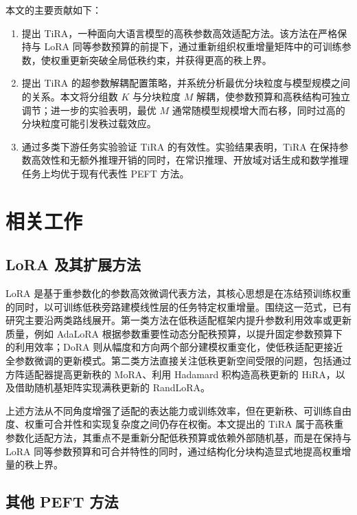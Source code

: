 ﻿\documentclass[UTF8,a4paper,11pt]{ctexart}
\begin{document}
本文的主要贡献如下：
\begin{enumerate}[leftmargin=2em]
    \item 提出 TiRA，一种面向大语言模型的高秩参数高效适配方法。该方法在严格保持与 LoRA 同等参数预算的前提下，通过重新组织权重增量矩阵中的可训练参数，使权重更新突破全局低秩约束，并获得更高的秩上界。
    \item 提出 TiRA 的超参数解耦配置策略，并系统分析最优分块粒度与模型规模之间的关系。本文将分组数 $K$ 与分块粒度 $M$ 解耦，使参数预算和高秩结构可独立调节；进一步的实验表明，最优 $M$ 通常随模型规模增大而右移，同时过高的分块粒度可能引发秩过载效应。
    \item 通过多类下游任务实验验证 TiRA 的有效性。实验结果表明，TiRA 在保持参数高效性和无额外推理开销的同时，在常识推理、开放域对话生成和数学推理任务上均优于现有代表性 PEFT 方法。
\end{enumerate}

\section{相关工作}

\subsection{LoRA 及其扩展方法}

LoRA\cite{hu2022lora} 是基于重参数化的参数高效微调代表方法，其核心思想是在冻结预训练权重的同时，以可训练低秩旁路建模线性层的任务特定权重增量。围绕这一范式，已有研究主要沿两类路线展开。第一类方法在低秩适配框架内提升参数利用效率或更新质量，例如 AdaLoRA\cite{zhang2023adalora} 根据参数重要性动态分配秩预算，以提升固定参数预算下的利用效率；DoRA\cite{liu2024dora} 则从幅度和方向两个部分建模权重变化，使低秩适配更接近全参数微调的更新模式。第二类方法直接关注低秩更新空间受限的问题，包括通过方阵适配器提高更新秩的 MoRA\cite{jiang2024mora}、利用 Hadamard 积构造高秩更新的 HiRA\cite{huang2025hira}，以及借助随机基矩阵实现满秩更新的 RandLoRA\cite{albert2025randlora}。

上述方法从不同角度增强了适配的表达能力或训练效率，但在更新秩、可训练自由度、权重可合并性和实现复杂度之间仍存在权衡。本文提出的 TiRA 属于高秩重参数化适配方法，其重点不是重新分配低秩预算或依赖外部随机基，而是在保持与 LoRA 同等参数预算和可合并特性的同时，通过结构化分块构造显式地提高权重增量的秩上界。

\subsection{其他 PEFT 方法}
\end{document}
